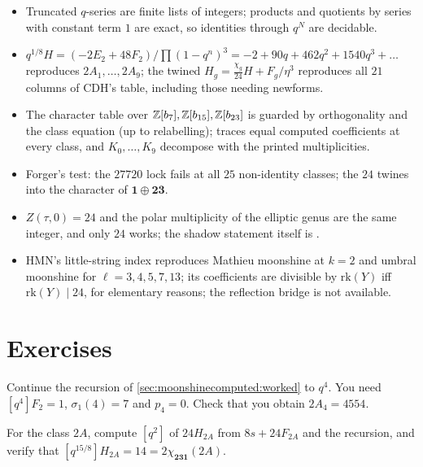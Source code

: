 \begin{summarybox}
\begin{itemize}[leftmargin=*]
\item Truncated $q$-series are finite lists of integers; products and quotients by series
  with constant term $1$ are exact, so identities through $q^N$ are decidable.
\item $q^{1/8}H=(-2E_2+48F_2)/\prod(1-q^n)^3=-2+90q+462q^2+1540q^3+\dots$ reproduces
  $2A_1,\dots,2A_9$; the twined $H_g=\frac{\chi_g}{24}H+F_g/\eta^3$ reproduces all $21$ columns
  of CDH's table, including those needing newforms.
\item The character table over $\mathbb{Z}[b_7],\mathbb{Z}[b_{15}],\mathbb{Z}[b_{23}]$ is guarded by orthogonality
  and the class equation (up to relabelling); traces equal computed coefficients at every
  class, and $K_0,\dots,K_9$ decompose with the printed multiplicities.
\item Forger's test: the $27720$ lock fails at all $25$ non-identity classes; the $24$
  twines into the character of $\mathbf1\oplus\mathbf{23}$.
\item $Z(\tau,0)=24$ and the polar multiplicity of the elliptic genus are the same integer,
  and only $24$ works; the shadow statement itself is \TL.
\item HMN's little-string index reproduces Mathieu moonshine at $k=2$ and umbral moonshine
  for $\ell=3,4,5,7,13$; its coefficients are divisible by $\mathrm{rk}(Y)$ iff
  $\mathrm{rk}(Y)\mid24$, for elementary reasons; the reflection bridge is not available.
\end{itemize}
\end{summarybox}

\section*{Exercises}

\begin{exercise}[$\star$]\label{exo:moonshinecomputed:h4}
Continue the recursion of \cref{sec:moonshinecomputed:worked} to $q^4$. You need
$[q^4]F_2=1$, $\sigma_1(4)=7$ and $p_4=0$. Check that you obtain $2A_4=4554$.
\end{exercise}

\begin{exercise}[$\star$]\label{exo:moonshinecomputed:2Aq2}
For the class $2A$, compute $[q^2]$ of $24H_{2A}$ from $8s+24F_{2A}$ and the recursion,
and verify that $[q^{15/8}]H_{2A}=14=2\chi_{\mathbf{231}}(2A)$.
\end{exercise}

